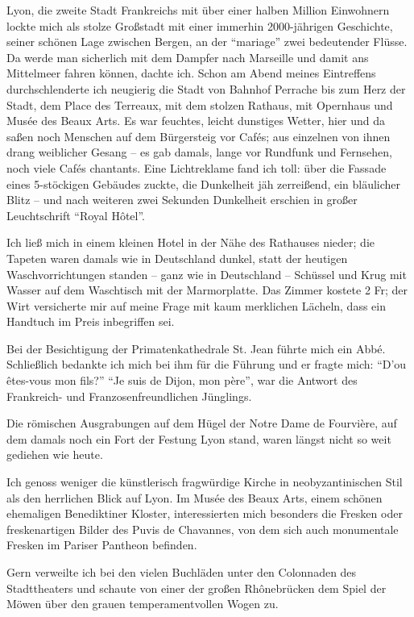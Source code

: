 Lyon, die zweite Stadt Frankreichs mit über einer halben Million Einwohnern lockte mich als stolze Großstadt mit einer immerhin \num{2000}-jährigen Geschichte, seiner schönen Lage zwischen Bergen, an der \enquote{mariage} zwei bedeutender Flüsse. Da werde man sicherlich mit dem Dampfer nach Marseille und damit ans Mittelmeer fahren können, dachte ich. Schon am Abend meines Eintreffens durchschlenderte ich neugierig die Stadt von Bahnhof Perrache bis zum Herz der Stadt, dem Place des Terreaux, mit dem stolzen Rathaus, mit Opernhaus und Musée des Beaux Arts. Es war feuchtes, leicht dunstiges Wetter, hier und da saßen noch Menschen auf dem Bürgersteig vor Cafés; aus einzelnen von ihnen drang weiblicher Gesang -- es gab damals, lange vor Rundfunk und Fernsehen, noch viele Cafés chantants. Eine Lichtreklame fand ich toll: über die Fassade eines 5-stöckigen Gebäudes zuckte, die Dunkelheit jäh zerreißend, ein bläulicher Blitz -- und nach weiteren zwei Sekunden Dunkelheit erschien in großer Leuchtschrift \enquote{Royal Hôtel}.

Ich ließ mich in einem kleinen Hotel in der Nähe des Rathauses nieder; die Tapeten waren damals wie in Deutschland dunkel, statt der heutigen Waschvorrichtungen standen -- ganz wie in Deutschland -- Schüssel und Krug mit Wasser auf dem Waschtisch mit der Marmorplatte. Das Zimmer kostete 2 Fr; der Wirt versicherte mir auf meine Frage mit kaum merklichen Lächeln, dass ein Handtuch im Preis inbegriffen sei.

Bei der Besichtigung der Primatenkathedrale St. Jean führte mich ein Abbé. Schließlich bedankte ich mich bei ihm für die Führung und er fragte mich: \enquote{D'ou êtes-vous mon fils?} \enquote{Je suis de Dijon, mon père}, war die Antwort des Frankreich- und Franzosenfreundlichen Jünglings.

Die römischen Ausgrabungen auf dem Hügel der Notre Dame de Fourvière, auf dem damals noch ein Fort der Festung Lyon stand, waren längst nicht so weit gediehen wie heute.

Ich genoss weniger die künstlerisch fragwürdige Kirche in neobyzantinischen Stil als den herrlichen Blick auf Lyon. Im Musée des Beaux Arts, einem schönen ehemaligen Benediktiner Kloster, interessierten mich besonders die Fresken oder freskenartigen Bilder des Puvis de Chavannes, von dem sich auch monumentale Fresken im Pariser Pantheon befinden.

Gern verweilte ich bei den vielen Buchläden unter den Colonnaden des Stadttheaters und schaute von einer der großen Rhônebrücken dem Spiel der Möwen über den grauen temperamentvollen Wogen zu.

